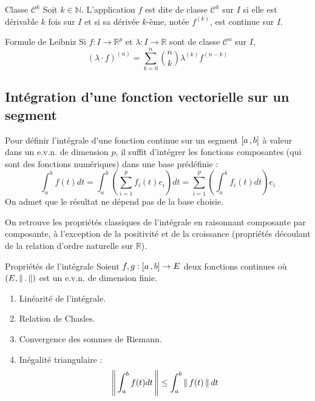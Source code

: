     \begin{defi}{Classe $\mathcal{C}^k$}{}
        Soit $k \in \mathbb{N}$. L’application $f$ est dite de classe $\mathcal{C}^k$ sur $I$ si elle est dérivable $k$ fois sur $I$ et si sa dérivée $k$-ème, notée $f^{(k)}$, est continue sur $I$.
    \end{defi}

    \begin{prop}{Formule de Leibniz}{}
        Si $f : I \to \mathbb{R}^p$ et $\lambda : I \to \mathbb{R}$ sont de classe $\mathcal{C}^n$ sur $I$, 
        \[ \left(\lambda \cdotp f\right)^{(n)} = \sum_{k=0}^{n} \binom{n}{k} \lambda^{(k)} f^{(n-k)} \]
    \end{prop}

\subsection{Intégration d’une fonction vectorielle sur un segment}

    Pour définir l’intégrale d’une fonction continue sur un segment $\left[ a \, , b \right]$ à valeur dans un e.v.n. de dimension $p$, il suffit d’intégrer les fonctions composantes (qui sont des fonctions numériques) dans une base prédéfinie :
    \[ \int_{a}^{b} f(t)dt = \int_{a}^{b} \left(\sum_{i=1}^{p} f_i(t)e_i \right) dt = \sum_{i=1}^{p} \left(\int_{a}^{b} f_i(t)dt\right) e_i \]
    On admet que le résultat ne dépend pas de la base choisie.

    On retrouve les propriétés classiques de l’intégrale en raisonnant composante par composante, à l’exception de la positivité et de la croissance (propriétés découlant de la relation d’ordre naturelle sur $\mathbb{R}$).

    \begin{prop}{Propriétés de l’intégrale}{}
        Soient $f,g : \left[ a \, , b \right] \to E$ deux fonctions continues où $(E,\left\lVert\,.\,\right\rVert)$ est un e.v.n. de dimension finie.
        \begin{enumerate}
            \item Linéarité de l’intégrale.
            \item Relation de Chasles.
            \item Convergence des sommes de Riemann.
            \item Inégalité triangulaire :
            \[ \left\lVert\,\int_{a}^{b} f(t)dt\,\right\rVert \leq \int_{a}^{b} \left\lVert\,f(t)\,\right\rVert dt \]
        \end{enumerate}
    \end{prop}

